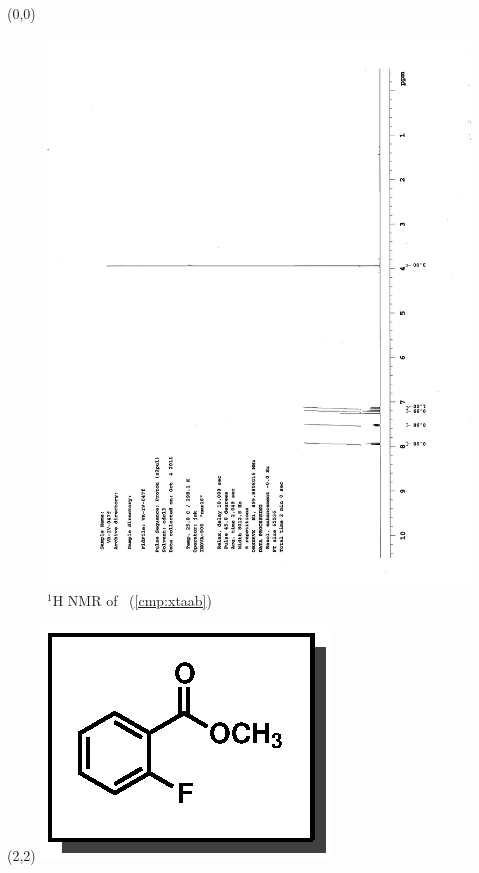\begin{textblock}{20}(0,0)
\begin{figure}[htb]
\caption{$^1$H NMR of \CMPxtaab\ (\ref{cmp:xtaab})}
\includegraphics[scale=0.75, trim = 0mm 0mm 0mm 5mm,
clip]{chp_asymmetric/images/nmr/xtaabH}
\vspace{-100pt}
\end{figure}
\end{textblock}
\begin{textblock}{1}(2,2)
\includegraphics[scale=0.8, angle=90]{chp_asymmetric/images/xtaab}
\end{textblock}
